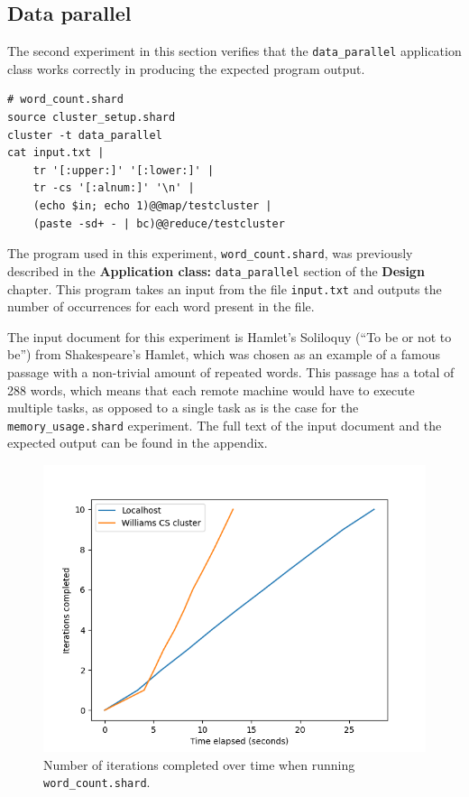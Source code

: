 \documentclass[twoside]{report}
\begin{document}
\subsection{Data parallel}
The second experiment in this section verifies that the \texttt{data\_parallel} application class works correctly in producing the expected program output.

\begin{minipage}[c]{\textwidth-15pt}
  \begin{lstlisting}[language=Shard]
# word_count.shard
source cluster_setup.shard
cluster -t data_parallel
cat input.txt |
    tr '[:upper:]' '[:lower:]' |
    tr -cs '[:alnum:]' '\n' |
    (echo $in; echo 1)@@map/testcluster |
    (paste -sd+ - | bc)@@reduce/testcluster
\end{lstlisting}
  \smallskip
\end{minipage}

The program used in this experiment, \texttt{word\_count.shard}, was previously described in the \textbf{Application class: }\texttt{data\_parallel} section of the \textbf{Design} chapter.
This program takes an input from the file \texttt{input.txt} and outputs the number of occurrences for each word present in the file.

The input document for this experiment is Hamlet's Soliloquy (``To be or not to be'') from Shakespeare's Hamlet, which was chosen as an example of a famous passage with a non-trivial amount of repeated words.
This passage has a total of 288 words, which means that each remote machine would have to execute multiple tasks, as opposed to a single task as is the case for the \texttt{memory\_usage.shard} experiment.
The full text of the input document and the expected output can be found in the appendix.

\begin{figure}[h]
  \begin{center}
    \includegraphics[scale=0.9]{img/experiments/e2_1620960581241.png}
    \caption{Number of iterations completed over time when running \texttt{word\_count.shard}.}
    \label{fig:wordcount}
  \end{center}
\end{figure}
\end{document}
